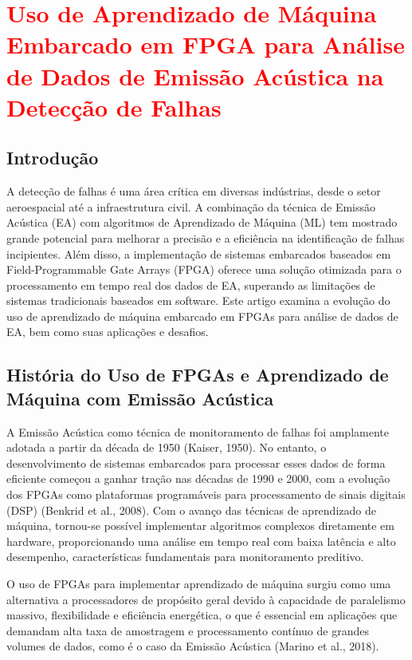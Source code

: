\section{\textcolor{red}{Uso de Aprendizado de Máquina Embarcado em FPGA para Análise de Dados de Emissão Acústica na Detecção de Falhas}}

\subsection{Introdução}

A detecção de falhas é uma área crítica em diversas indústrias, desde o setor aeroespacial até a infraestrutura civil. A combinação da técnica de Emissão Acústica (EA) com algoritmos de Aprendizado de Máquina (ML) tem mostrado grande potencial para melhorar a precisão e a eficiência na identificação de falhas incipientes. Além disso, a implementação de sistemas embarcados baseados em Field-Programmable Gate Arrays (FPGA) oferece uma solução otimizada para o processamento em tempo real dos dados de EA, superando as limitações de sistemas tradicionais baseados em software. Este artigo examina a evolução do uso de aprendizado de máquina embarcado em FPGAs para análise de dados de EA, bem como suas aplicações e desafios.

\subsection{História do Uso de FPGAs e Aprendizado de Máquina com Emissão Acústica}

A Emissão Acústica como técnica de monitoramento de falhas foi amplamente adotada a partir da década de 1950 (Kaiser, 1950). No entanto, o desenvolvimento de sistemas embarcados para processar esses dados de forma eficiente começou a ganhar tração nas décadas de 1990 e 2000, com a evolução dos FPGAs como plataformas programáveis para processamento de sinais digitais (DSP) (Benkrid et al., 2008). Com o avanço das técnicas de aprendizado de máquina, tornou-se possível implementar algoritmos complexos diretamente em hardware, proporcionando uma análise em tempo real com baixa latência e alto desempenho, características fundamentais para monitoramento preditivo.

O uso de FPGAs para implementar aprendizado de máquina surgiu como uma alternativa a processadores de propósito geral devido à capacidade de paralelismo massivo, flexibilidade e eficiência energética, o que é essencial em aplicações que demandam alta taxa de amostragem e processamento contínuo de grandes volumes de dados, como é o caso da Emissão Acústica (Marino et al., 2018).

